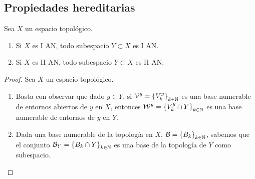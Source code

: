 \subsection*{Propiedades hereditarias}

\begin{prop} Sea $\displaystyle X $ un espacio topológico. 
	\begin{enumerate}
	\item Si $\displaystyle X $ es I AN, todo subespacio $\displaystyle Y \subset X $ es I AN.
	\item Si $\displaystyle X $ es II AN, todo subespacio $\displaystyle Y \subset X $ es II AN. 
	\end{enumerate}
\end{prop}
\begin{proof}
	Sea $\displaystyle X $ un espacio topológico. 
	\begin{enumerate}
	\item Basta con observar que dado $\displaystyle y \in Y $, si $\displaystyle \mathcal{V}^{y}= \left\{ V^{y}_{k}\right\} _{k \in \mathbb{N}} $ es una base numerable de entornos abiertos de $\displaystyle y $ en $\displaystyle X $, entonces $\displaystyle \mathcal{W}^{y}= \left\{ V^{y}_{k}\cap Y\right\} _{k\in \mathbb{N}} $ es una base numerable de entornos de $\displaystyle y $ en $\displaystyle Y $.
	\item Dada una base numerable de la topología en $\displaystyle X $, $\displaystyle \mathcal{B}= \left\{ B_{k}\right\} _{k \in \mathbb{N}} $, sabemos que el conjunto $\displaystyle \mathcal{B}_{Y}= \left\{ B_{k}\cap Y\right\} _{k \in \mathbb{N}} $ es una base de la topología de $\displaystyle Y $ como subespacio.
	\end{enumerate}
\end{proof}


